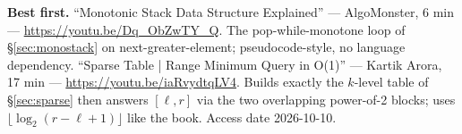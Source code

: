\begin{rulebox}
\smallskip\noindent\textbf{Best first.}
``Monotonic Stack Data Structure Explained'' --- AlgoMonster, 6 min ---
\url{https://youtu.be/Dq_ObZwTY_Q}. The
pop-while-monotone loop of \S\ref{sec:monostack} on next-greater-element;
pseudocode-style, no language dependency.
\smallskip\noindent
``Sparse Table | Range Minimum Query in O(1)'' --- Kartik Arora,
17 min --- \url{https://youtu.be/iaRvydtqLV4}. Builds
exactly the $k$-level table of \S\ref{sec:sparse} then answers
$[\ell,r]$ via the two overlapping power-of-2 blocks; uses
$\lfloor\log_2(r-\ell+1)\rfloor$ like the book. Access date 2026-10-10.
\end{rulebox}
